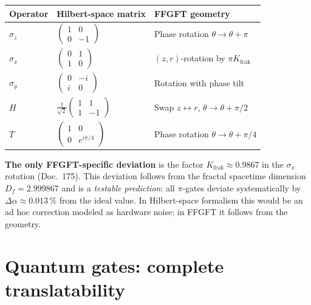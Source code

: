 \begin{center}
\renewcommand{\arraystretch}{1.4}
{\small
\begin{tabular}{>{\raggedright\arraybackslash}p{1.6cm}>{\raggedright\arraybackslash}p{3.2cm}>{\raggedright\arraybackslash}p{3.6cm}}
\toprule
\textbf{Operator} & \textbf{Hilbert-space matrix} & \textbf{FFGFT geometry} \\
\midrule
$\sigma_z$ & $\begin{pmatrix}1 & 0 \\ 0 & -1\end{pmatrix}$
           & Phase rotation $\theta \to \theta + \pi$ \\
$\sigma_x$ & $\begin{pmatrix}0 & 1 \\ 1 & 0\end{pmatrix}$
           & $(z, r)$-rotation by $\pi K_{\text{frak}}$ \\
$\sigma_y$ & $\begin{pmatrix}0 & -i \\ i & 0\end{pmatrix}$
           & Rotation with phase tilt \\
$H$ & $\frac{1}{\sqrt{2}}\begin{pmatrix}1 & 1 \\ 1 & -1\end{pmatrix}$
    & Swap $z \leftrightarrow r$, $\theta \to \theta + \pi/2$ \\
$T$ & $\begin{pmatrix}1 & 0 \\ 0 & e^{i\pi/4}\end{pmatrix}$
    & Phase rotation $\theta \to \theta + \pi/4$ \\
\bottomrule
\end{tabular}
}
\renewcommand{\arraystretch}{1.0}
\end{center}

\textbf{The only FFGFT-specific deviation} is the factor
$K_{\text{frak}} \approx 0.9867$ in the $\sigma_x$ rotation
(Doc.~175). This deviation follows from the fractal spacetime
dimension $D_f = 2.999867$ and is a \emph{testable prediction}: all
$\pi$-gates deviate systematically by $\Delta\alpha \approx 0.013\,\%$
from the ideal value. In Hilbert-space formalism this would be an
ad hoc correction modeled as hardware noise; in FFGFT it follows
from the geometry.

\section{Quantum gates: complete translatability}


